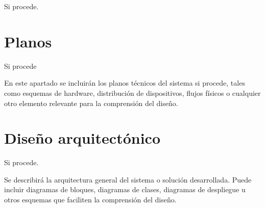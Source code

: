 
Si procede.

\section{Planos}

Si procede

En este apartado se incluirán los planos técnicos del sistema si procede, tales como esquemas de hardware, distribución de dispositivos, flujos físicos o cualquier otro elemento relevante para la comprensión del diseño.

\section{Diseño arquitectónico}

Si procede.

Se describirá la arquitectura general del sistema o solución desarrollada. Puede incluir diagramas de bloques, diagramas de clases, diagramas de despliegue u otros esquemas que faciliten la comprensión del diseño.
